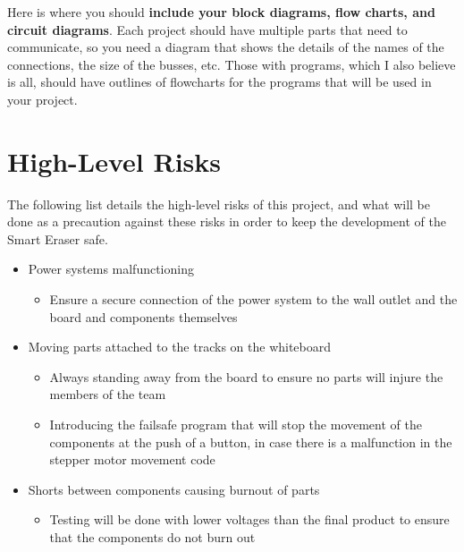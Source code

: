 Here is where you should \textbf{include your block diagrams, flow charts, and circuit diagrams}.
Each project should have multiple parts that need to communicate, so you need a diagram that shows the details
of the names of the connections, the size of the busses, etc.  Those with programs, which I also believe is all,
should have outlines of flowcharts for the programs that will be used in your project.

\section{High-Level Risks}
The following list details the high-level risks of this project, and what will be done as a precaution against these risks in order to keep the development of the Smart Eraser safe.
\begin{itemize}
	\item Power systems malfunctioning
	\begin{itemize}
	\item Ensure a secure connection of the power system to the wall outlet and the board and components themselves
	\end{itemize}
	\item Moving parts attached to the tracks on the whiteboard
	\begin{itemize}
	\item Always standing away from the board to ensure no parts will injure the members of the team
	\item Introducing the failsafe program that will stop the movement of the components at the push of a button, in case there is a malfunction in the stepper motor movement code
	\end{itemize}
	\item Shorts between components causing burnout of parts
	\begin{itemize}
	\item Testing will be done with lower voltages than the final product to ensure that the components do not burn out
\end{itemize}
\end{itemize}

\pagebreak


